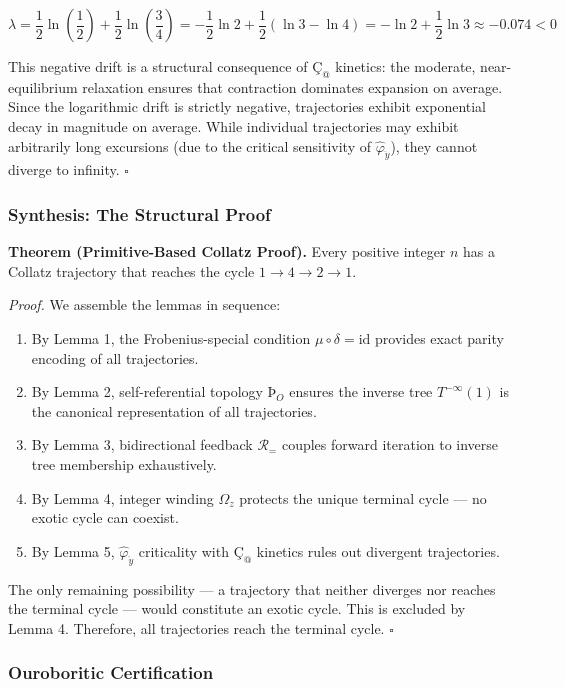 \documentclass[12pt,a4paper]{article}
\begin{document}
\[\lambda = \frac{1}{2}\ln\left(\frac{1}{2}\right) + \frac{1}{2}\ln\left(\frac{3}{4}\right) = -\frac{1}{2}\ln 2 + \frac{1}{2}(\ln 3 - \ln 4) = -\ln 2 + \frac{1}{2}\ln 3 \approx -0.074 < 0\]

This negative drift is a structural consequence of $\text{Ç}_@$ kinetics: the moderate, near-equilibrium relaxation ensures that contraction dominates expansion on average. Since the logarithmic drift is strictly negative, trajectories exhibit exponential decay in magnitude on average. While individual trajectories may exhibit arbitrarily long excursions (due to the critical sensitivity of $\hat{\varphi}_{\ddot{y}}$), they cannot diverge to infinity. $\square$

\subsubsection{Synthesis: The Structural Proof}

\textbf{Theorem (Primitive-Based Collatz Proof).} Every positive integer $n$ has a Collatz trajectory that reaches the cycle $1 \to 4 \to 2 \to 1$.

\emph{Proof.} We assemble the lemmas in sequence:

\begin{enumerate}
    \item By Lemma 1, the Frobenius-special condition $\mu \circ \delta = \text{id}$ provides exact parity encoding of all trajectories.
    \item By Lemma 2, self-referential topology $\text{Þ}_O$ ensures the inverse tree $T^{-\infty}(1)$ is the canonical representation of all trajectories.
    \item By Lemma 3, bidirectional feedback $\mathcal{R}_=$ couples forward iteration to inverse tree membership exhaustively.
    \item By Lemma 4, integer winding $\Omega_z$ protects the unique terminal cycle --- no exotic cycle can coexist.
    \item By Lemma 5, $\hat{\varphi}_{\ddot{y}}$ criticality with $\text{Ç}_@$ kinetics rules out divergent trajectories.
\end{enumerate}

The only remaining possibility --- a trajectory that neither diverges nor reaches the terminal cycle --- would constitute an exotic cycle. This is excluded by Lemma 4. Therefore, all trajectories reach the terminal cycle. $\square$

\subsubsection{Ouroboritic Certification}
\end{document}
